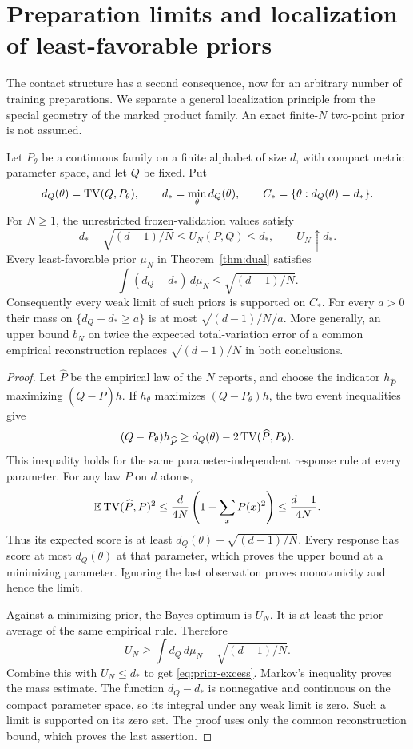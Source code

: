 \section{Preparation limits and localization of least-favorable priors}
\label{sec:preparation-localization}
The contact structure has a second consequence, now for an arbitrary
number of training preparations. We separate a general localization
principle from the special geometry of the marked product family. An
exact finite-$N$ two-point prior is not assumed.

\begin{theorem}
\label{thm:prior-localization}
Let $P_\theta$ be a continuous family on a finite alphabet of size $d$,
with compact metric parameter space, and let $Q$ be fixed. Put
\[
 d_Q(\theta)=\operatorname{TV}(Q,P_\theta),\qquad d_* =\min_\theta d_Q(\theta),
 \qquad C_* =\{\theta:d_Q(\theta)=d_*\}.
\]
For $N\ge1$, the unrestricted frozen-validation values satisfy
\begin{equation}\label{eq:nearest-limit}
 d_* -\sqrt{(d-1)/N}\le U_N(P,Q)\le d_*,\qquad
 U_N\uparrow d_*.
\end{equation}
Every least-favorable prior $\mu_N$ in Theorem~\ref{thm:dual} satisfies
\begin{equation}\label{eq:prior-excess}
 \int(d_Q-d_*)\,d\mu_N\le\sqrt{(d-1)/N}.
\end{equation}
Consequently every weak limit of such priors is supported on $C_*$.
For every $a>0$ their mass on $\{d_Q-d_*\ge a\}$ is at most
$\sqrt{(d-1)/N}/a$. More generally, an upper bound $b_N$ on twice the
expected total-variation error of a common empirical reconstruction
replaces $\sqrt{(d-1)/N}$ in both conclusions.
\end{theorem}
\begin{proof}
Let $\widehat P$ be the empirical law of the $N$ reports, and choose the
indicator $h_{\widehat P}$ maximizing $(Q-\widehat P)h$. If $h_\theta$
maximizes $(Q-P_\theta)h$, the two event inequalities give
\[
 (Q-P_\theta)h_{\widehat P}
 \ge d_Q(\theta)-2\operatorname{TV}(\widehat P,P_\theta).
\]
This inequality holds for the same parameter-independent response rule
at every parameter. For any law $P$ on $d$ atoms,
\[
 \mathbb E\operatorname{TV}(\widehat P,P)^2
 \le\frac{d}{4N}\left(1-\sum_xP(x)^2\right)
 \le\frac{d-1}{4N}.
\]
Thus its expected score is at least $d_Q(\theta)-\sqrt{(d-1)/N}$.
Every response has score at most $d_Q(\theta)$ at that parameter,
which proves the upper bound at a minimizing parameter. Ignoring the
last observation proves monotonicity and hence the limit.

Against a minimizing prior, the Bayes optimum is $U_N$. It is at least
the prior average of the same empirical rule. Therefore
\[
 U_N\ge \int d_Q\,d\mu_N-\sqrt{(d-1)/N}.
\]
Combine this with $U_N\le d_*$ to get \eqref{eq:prior-excess}.
Markov's inequality proves the mass estimate. The function $d_Q-d_*$
is nonnegative and continuous on the compact parameter space, so its
integral under any weak limit is zero. Such a limit is supported on
its zero set. The proof uses only the common reconstruction bound,
which proves the last assertion.
\end{proof}


